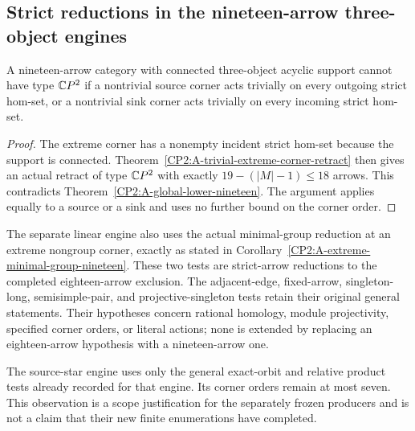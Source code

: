 \subsection{Strict reductions in the nineteen-arrow three-object engines}

\begin{corollary}
\label{CP2:A-three-object-trivial-extreme-actions-nineteen}
A nineteen-arrow category with connected three-object acyclic support
cannot have type $\mathbb{C}P^2$ if a nontrivial source corner acts trivially on
every outgoing strict hom-set, or a nontrivial sink corner acts trivially
on every incoming strict hom-set.
\end{corollary}
\begin{proof}
The extreme corner has a nonempty incident strict hom-set because the
support is connected. Theorem~\ref{CP2:A-trivial-extreme-corner-retract}
then gives an actual retract of type $\mathbb{C}P^2$ with exactly
$19-(|M|-1)\le18$ arrows. This contradicts
Theorem~\ref{CP2:A-global-lower-nineteen}. The argument applies equally
to a source or a sink and uses no further bound on the corner order.
\end{proof}

The separate linear engine also uses the actual minimal-group
reduction at an extreme nongroup corner, exactly as stated in
Corollary~\ref{CP2:A-extreme-minimal-group-nineteen}. These two tests are
strict-arrow reductions to the completed eighteen-arrow exclusion.
The adjacent-edge, fixed-arrow, singleton-long, semisimple-pair, and
projective-singleton tests retain their original general statements.
Their hypotheses concern rational homology, module projectivity,
specified corner orders, or literal actions; none is extended by
replacing an eighteen-arrow hypothesis with a nineteen-arrow one.

The source-star engine uses only the general exact-orbit and relative
product tests already recorded for that engine. Its corner orders
remain at most seven. This observation is a scope justification for
the separately frozen producers and is not a claim that their new
finite enumerations have completed.

